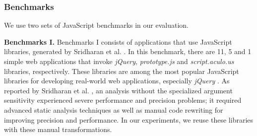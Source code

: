 

\subsubsection{Benchmarks}

We use two sets of JavaScript benchmarks in our evaluation.



{\bf Benchmarks I.} Benchmarks I consists of applications that use JavaScript libraries, generated by Sridharan et al. \cite{Sridharan:2012:CTP:2367163.2367191}. In this benchmark, there are 11, 5 and 1 simple web applications that invoke {\it jQuery}, {\it prototype.js} and {\it script.aculo.us} libraries, respectively. These libraries are among the most popular JavaScript libraries for developing real-world web applications, especially {\it jQuery} \cite{LibraryUsage}. As reported by Sridharan et al. \cite{Sridharan:2012:CTP:2367163.2367191}, an analysis without the specialized argument sensitivity experienced severe performance and precision problems; it required advanced static analysis techniques as well as manual code rewriting for improving precision and performance. In our experiments, we reuse these libraries with these manual transformations.

